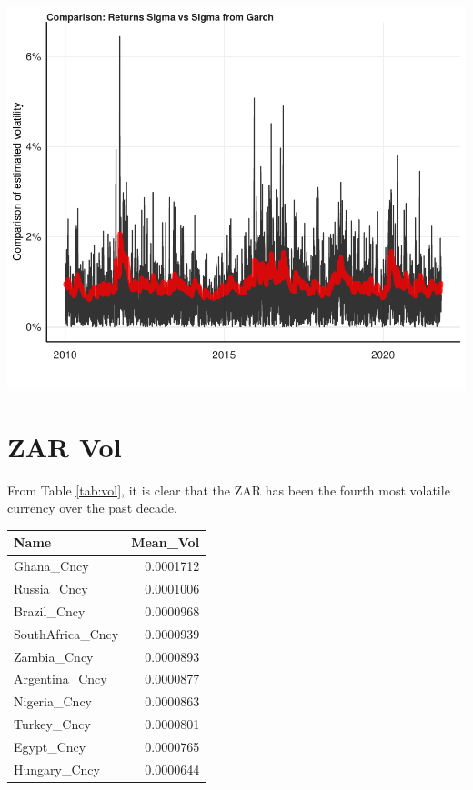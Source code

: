 \documentclass[11pt,preprint, authoryear]{elsarticle}
\let\origtable\table
\let\endorigtable\endtable
\renewenvironment{table}[1][2] {
    \expandafter\origtable\expandafter[H]
} {
    \endorigtable
}
\numberwithin{equation}{section}
\numberwithin{figure}{section}
\numberwithin{table}{section}
\begin{document}
\includegraphics{Question4_files/figure-latex/q4_2-3.pdf}

\hypertarget{zar-vol}{%
\section{ZAR Vol}\label{zar-vol}}

From Table \ref{tab:vol}, it is clear that the ZAR has been the fourth
most volatile currency over the past decade.

\begin{table}

\caption{\label{tab:vol}Top 10 Highest Mean Squared Returns}
\centering
\begin{tabular}[t]{l|r}
\hline
Name & Mean\_Vol\\
\hline
Ghana\_Cncy & 0.0001712\\
\hline
Russia\_Cncy & 0.0001006\\
\hline
Brazil\_Cncy & 0.0000968\\
\hline
SouthAfrica\_Cncy & 0.0000939\\
\hline
Zambia\_Cncy & 0.0000893\\
\hline
Argentina\_Cncy & 0.0000877\\
\hline
Nigeria\_Cncy & 0.0000863\\
\hline
Turkey\_Cncy & 0.0000801\\
\hline
Egypt\_Cncy & 0.0000765\\
\hline
Hungary\_Cncy & 0.0000644\\
\hline
\end{tabular}
\end{table}
\end{document}
